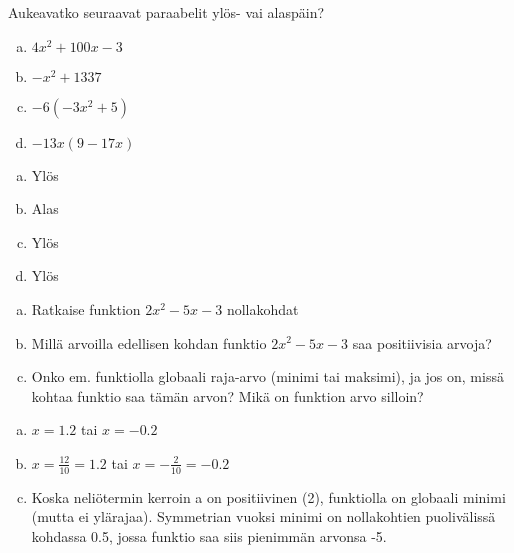 \begin{tehtava}
  Aukeavatko seuraavat paraabelit ylös- vai alaspäin?
  \begin{enumerate}[a)]
    \item $4x^2 + 100x - 3$
    \item $-x^2 + 1337$
    \item $-6(-3x^2 + 5)$
    \item $-13x(9 - 17x)$ 
  \end{enumerate}

  \begin{vastaus}
    \begin{enumerate}[a)]
      \item Ylös
      \item Alas
      \item Ylös
      \item Ylös
    \end{enumerate}
  \end{vastaus}
\end{tehtava}

\begin{tehtava}
  \begin{enumerate}[a)]
    \item Ratkaise funktion $2x^2 - 5x - 3$ nollakohdat
    \item Millä arvoilla edellisen kohdan funktio $2x^2 - 5x - 3$ saa positiivisia arvoja?
    \item Onko em. funktiolla globaali raja-arvo (minimi tai maksimi), ja jos on, missä kohtaa funktio saa tämän arvon? Mikä on funktion arvo silloin?
  \end{enumerate}

  \begin{vastaus}
    \begin{enumerate}[a)]
      \item $x = 1.2$ tai $x = -0.2$
      \item $x = \frac{12}{10} = 1.2$ tai $x = -\frac{2}{10} = -0.2$
      \item Koska neliötermin kerroin a on positiivinen (2), funktiolla on globaali minimi (mutta ei ylärajaa). Symmetrian vuoksi minimi on nollakohtien puolivälissä kohdassa 0.5, jossa funktio saa siis pienimmän arvonsa -5.
    \end{enumerate}
  \end{vastaus}
\end{tehtava}

